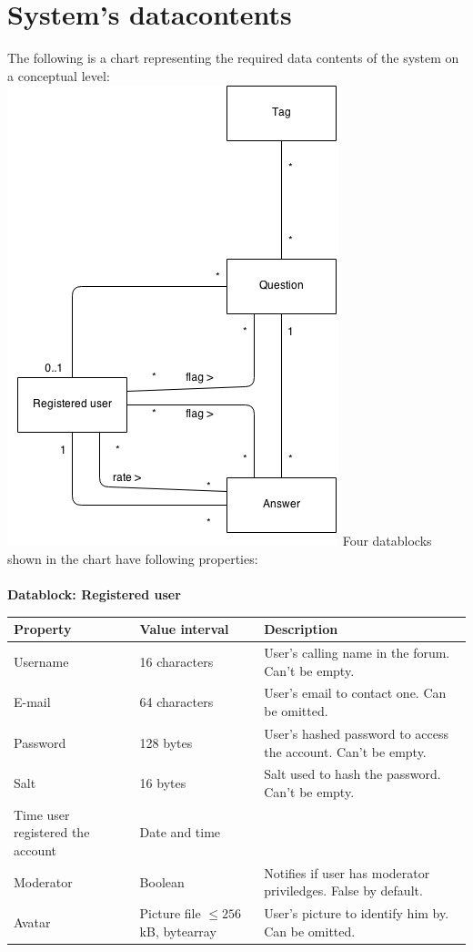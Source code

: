 \documentclass[a4paper,12pt]{article}
\begin{document}
\section{System's datacontents}
The following is a chart representing the required data contents of the system on a conceptual level:\\
\includegraphics{ConceptChart}
\newpage
\noindent Four datablocks shown in the chart have following properties:\\
\\
\textbf{Datablock: Registered user}
\begin{center}
    \begin{tabular}{ | p{3cm} | p{4cm} | p{5cm} |}
    \hline
    Property & Value interval & Description \\ \hline
    Username & 16 characters & User's calling name in the forum. Can't be empty. \\ \hline
    E-mail & 64 characters & User's email to contact one. Can be omitted. \\ \hline
    Password & 128 bytes & User's hashed password to access the account. Can't be empty. \\
    \hline
    Salt & 16 bytes & Salt used to hash the password. Can't be empty. \\
    \hline
    Time user registered the account & Date and time &  \\
    \hline
    Moderator & Boolean & Notifies if user has moderator priviledges. False by default. \\ \hline
    Avatar & Picture file $\leq{256}$ kB, bytearray & User's picture to identify him by. Can be omitted. \\
    \hline
    \end{tabular}
\end{center}
\end{document}
